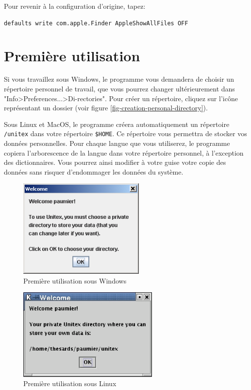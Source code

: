 \bigskip
\noindent Pour revenir à la configuration d'origine, tapez: 

\bigskip
\verb+defaults write com.apple.Finder AppleShowAllFiles OFF+


\section{Première utilisation}
Si vous travaillez sous Windows, le programme vous demandera de choisir un répertoire personnel
 de travail, que vous pourrez changer ultérieurement dans
"Info>Preferences...>Di-rectories". Pour créer un répertoire, cliquez sur l’icône représentant un
dossier (voir figure \ref{fig-creation-personal-directory}).

\bigskip
\noindent Sous Linux et MacOS, le programme créera automatiquement un répertoire
\verb+/unitex+ dans votre répertoire \verb+$HOME+. Ce répertoire vous permettra de stocker vos
données personnelles. 
Pour chaque langue que vous utiliserez, le programme copiera l’arborescence de la langue dans votre
répertoire personnel,
à l’exception des dictionnaires. Vous pourrez ainsi modifier à votre guise votre copie des données
sans risquer d’endommager les données du système.



\begin{figure}[h]
\begin{center}
\includegraphics[width=6.3cm]{resources/img/fig1-1.png}
\caption{Première utilisation sous Windows}
\end{center}
\end{figure}

\begin{figure}[h]
\begin{center}
\includegraphics[width=7cm]{resources/img/fig1-2.png}
\caption{Première utilisation sous Linux}
\end{center}
\end{figure}

